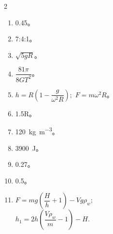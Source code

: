 \begin{fullwidth}
\begin{multicols}{2}
\begin{enumerate}[label=\arabic*.]
\addtocounter{enumi}{2}
\item 0.45。
\item 7:4:1。
\item $\sqrt{5gR}$。
\item $\dfrac{81 \pi}{8 GT^{2}}$。
\item  $h=R \left(1- \dfrac{g}{\omega^{2} R} \right);\,\, F=m\omega^{2} R$。
\item 1.5R。
\item \SI[per-mode=symbol]{120}{\kilo\gram\per\metre\cubed}。
\item \SI{3900}{\joule}。
\item 0.27。
\item 0.5。
\item
$F =mg \left( \dfrac{H}{h} + 1 \right) - V g \rho_{w}; $\\
$h_{1} = 2h \left( \dfrac{V \rho_{w}}{m} - 1 \right) - H.$


\end{enumerate}
\end{multicols}
\end{fullwidth}
